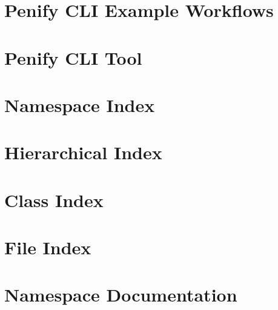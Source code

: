 \documentclass[twoside]{book}
\newcommand{\+}{\discretionary{\mbox{\scriptsize$\hookleftarrow$}}{}{}}
\begin{document}
\chapter{Penify CLI Example Workflows}
\label{md__tmp_github_reposRepoArchDocGenContext_Penify_dev_penify_cli_docs_example_workflows}

\chapter{Penify CLI Tool}
\label{md__tmp_github_reposRepoArchDocGenContext_Penify_dev_penify_cli_README}

\chapter{Namespace Index}

\chapter{Hierarchical Index}

\chapter{Class Index}

\chapter{File Index}

\chapter{Namespace Documentation}




























\end{document}
